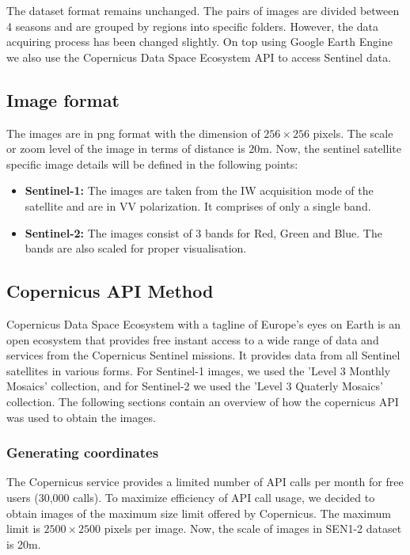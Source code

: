The dataset format remains unchanged. The pairs of images are divided between 4 seasons and are grouped by regions into specific folders. However, the data acquiring process has been changed slightly. On top using Google Earth Engine\cite{GORELICK201718} we also use the Copernicus Data Space Ecosystem API to access Sentinel data.

\subsection{Image format}
The images are in png format with the dimension of $256\times256$ pixels. The scale or zoom level of the image in terms of distance is 20m. Now, the sentinel satellite specific image details will be defined in the following points:
\begin{itemize}
    \item \textbf{Sentinel-1:} The images are taken from the IW acquisition mode of the satellite and are in VV polarization. It comprises of only a single band.
    \item \textbf{Sentinel-2:} The images consist of 3 bands for Red, Green and Blue. The bands are also scaled for proper visualisation.
\end{itemize}

\subsection{Copernicus API Method}
Copernicus Data Space Ecosystem with a tagline of Europe's eyes on Earth is an open ecosystem that provides free instant access to a wide range of data and services from the Copernicus Sentinel missions. It provides data from all Sentinel satellites in various forms. For Sentinel-1 images, we used the 'Level 3 Monthly Mosaics' collection, and for Sentinel-2 we used the 'Level 3 Quaterly Mosaics' collection.
The following sections contain an overview of how the copernicus API was used to obtain the images.

\subsubsection{Generating coordinates}
The Copernicus service provides a limited number of API calls per month for free users (30,000 calls). To maximize efficiency of API call usage, we decided to obtain images of the maximum size limit offered by Copernicus. The maximum limit is $2500\times2500$ pixels per image. Now, the scale of images in SEN1-2 dataset is 20m.

